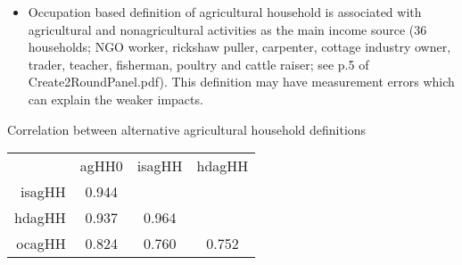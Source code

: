 \clearpage
\begin{itemize}
\vspace{1.0ex}\setlength{\itemsep}{1.0ex}\setlength{\baselineskip}{12pt}
\item	Occupation based definition of agricultural household is associated with agricultural and nonagricultural activities as the main income source (36 households; NGO worker, rickshaw puller, carpenter, cottage industry owner, trader, teacher, fisherman, poultry and cattle raiser; see p.5 of Create2RoundPanel.pdf). This definition may have measurement errors which can explain the weaker impacts.
\end{itemize}

Correlation between alternative agricultural household definitions\\
\hfil\begin{tabular}{rccc}
      & agHH0 & isagHH & hdagHH \\
isagHH & 0.944 &  &  \\
hdagHH & 0.937 & 0.964 &  \\
ocagHH & 0.824 & 0.760 & 0.752 
\end{tabular}

